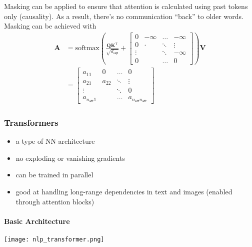 Masking can be applied to ensure that attention is calculated using past tokens only (causality). As a result, there's no communication ``back'' to older words.
Masking can be achieved with
\noindent\begin{align*}
    \mathbf{A} & = \mathrm{softmax}\left(\frac{\mathbf{QK}^{\mathsf{T}}}{\sqrt{d_{\mathsf{rep}}}}+
    \begin{bmatrix}
        0      & -\infty & \hdots & -\infty \\
        0      & \cdot   & \ddots & \vdots  \\
        \vdots &         & \ddots & -\infty \\
        0      &         & \hdots & 0
    \end{bmatrix}
    \right)\mathbf{V}                                                                                                      \\
               & =  \begin{bmatrix}
                        a_{11}                & 0      & \hdots & 0                                    \\
                        a_{21}                & a_{22} & \ddots & \vdots                               \\
                        \vdots                &        & \ddots & 0                                    \\
                        a_{n_{\mathsf{att}}1} &        & \hdots & a_{n_{\mathsf{att}}n_{\mathsf{att}}}
                    \end{bmatrix}
\end{align*}

\subsubsection{Transformers}
\begin{itemize}
    \item a type of NN architecture
    \item no exploding or vanishing gradients
    \item can be trained in parallel
    \item good at handling long-range dependencies in text and images (enabled through attention blocks)
\end{itemize}
\paragraph{Basic Architecture}
\begin{center}
    \texttt{[image: nlp\_transformer.png]}
\end{center}

